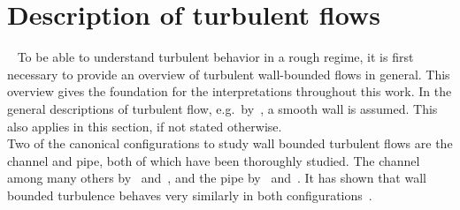\section{Description of turbulent flows}~\label{sec: Description of turbulent flows}
To be able to understand turbulent behavior in a rough regime, it is first necessary to provide an overview of turbulent wall-bounded flows in general.
This overview gives the foundation for the interpretations throughout this work.
In the general descriptions of turbulent flow, e.g.\ by~\cite{popeTurbulentFlows2015}, a smooth wall is assumed.
This also applies in this section, if not stated otherwise.\\
Two of the canonical configurations to study wall bounded turbulent flows are the channel and pipe, both of which have been thoroughly studied.
The channel among many others by~\cite{kimTurbulenceStatisticsFully1987} and~\cite{leeDirectNumericalSimulation2015}, and the pipe by~\cite{jimenezCascadesWallBoundedTurbulence2012} and~\cite{yaoDirectNumericalSimulations2023}.
It has shown that wall bounded turbulence behaves very similarly in both configurations~\citep{khouryTurbulentPipeFlow2014, kimProgressPipeChannel2012}.
